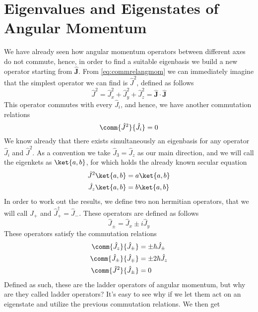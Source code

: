 \documentclass[a4paper, 11pt]{book}
\renewcommand{\vec}[1]{\mathbf{#1}}
\newcommand{\1}{\opr{\mathds{1}}}
\newcommand{\opr}[1]{\hat{#1}}
\newcommand{\adj}[2][]{#2^{\dagger#1}}
\theoremstyle{plain}
\begin{document}
	\section{Eigenvalues and Eigenstates of Angular Momentum}
	We have already seen how angular momentum operators between different axes do not commute, hence, in order to find a suitable eigenbasis we build a new operator starting from $\opr{\vec{J}}$. From \eqref{eq:commrelangmom} we can immediately imagine that the simplest operator we can find is $\opr{J}^2$, defined as follows
	\begin{equation*}
		\opr{J}^2=\opr{J}_x^2+\opr{J}_y^2+\opr{J}_z^2=\opr{\vec{J}}\cdot\opr{\vec{J}}
	\end{equation*}
	This operator commutes with every $\opr{J}_i$, and hence, we have another commutation relations
	\begin{equation}
		\comm{\opr{J}^2}{\opr{J}_i}=0
		\label{eq:jsqjcommrel}
	\end{equation}
	We know already that there exists simultaneously an eigenbasis for any operator $\opr{J}_i$ and $\opr{J}^2$. As a convention we take $\opr{J}_3=\opr{J}_z$ as our main direction, and we will call the eigenkets as $\ket{a,b}$, for which holds the already known secular equation
	\begin{equation*}
		\begin{aligned}
			\opr{J}^2\ket{a,b}&=a\ket{a,b}\\
			\opr{J}_z\ket{a,b}&=b\ket{a,b}
		\end{aligned}
	\end{equation*}
	In order to work out the results, we define two non hermitian operators, that we will call $\opr{J}_+$ and $\adj{\opr{J}}_+=\opr{J}_-$. These operators are defined as follows
	\begin{equation}
		\opr{J}_{\pm}=\opr{J}_x\pm i\opr{J}_y
		\label{eq:ladderopangmom}
	\end{equation}
	These operators satisfy the commutation relations
	\begin{equation}
		\begin{aligned}
			\comm{\opr{J}_z}{\opr{J}_{\pm}}&=\pm\hbar\opr{J}_{\pm}\\
			\comm{\opr{J}_{\pm}}{\opr{J}_{\mp}}&=\pm2\hbar\opr{J}_z\\
			\comm{\opr{J}^2}{\opr{J}_{\pm}}&=0
		\end{aligned}
		\label{eq:ladderopcommrel}
	\end{equation}
	Defined as such, these are the ladder operators of angular momentum, but why are they called ladder operators? It's easy to see why if we let them act on an eigenstate and utilize the previous commutation relations. We then get
\end{document}

